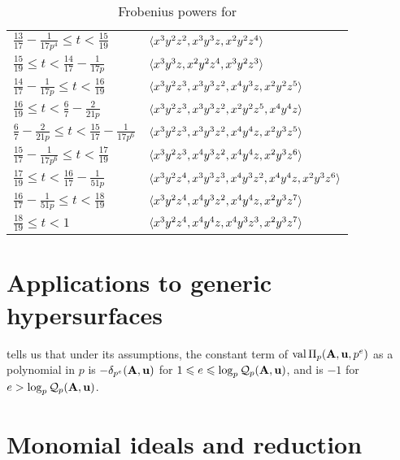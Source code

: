 \documentclass{amsart}
\begin{document}
\begin{example}
\begin{table}
\begin{center}
\begin{tabular}{ll}
        $\frac{13}{17} - \frac1{17 p^4} \le t < \frac{15}{19}$ & $\langle x^3y^2z^2, x^3y^3z, x^2y^2z^4 \rangle$ \\
        $\frac{15}{19} \le t < \frac{14}{17} - \frac1{17 p}$ & $\langle x^3y^3z, x^2y^2z^4, x^3y^2z^3 \rangle$ \\
        $\frac{14}{17} - \frac1{17 p} \le t < \frac{16}{19}$ & $\langle x^3y^2z^3, x^3y^3z^2, x^4y^3z, x^2y^2z^5 \rangle$ \\
        $\frac{16}{19} \le t < \frac67 - \frac2{21 p}$ & $\langle x^3y^2z^3, x^3y^3z^2, x^2y^2z^5, x^4y^4z \rangle$ \\
        $\frac67 - \frac2{21 p} \le t < \frac{15}{17} - \frac1{17 p^6}$ & $\langle x^3y^2z^3, x^3y^3z^2, x^4y^4z, x^2y^3z^5 \rangle$ \\
        $\frac{15}{17} - \frac1{17 p^6} \le t < \frac{17}{19}$ & $\langle x^3y^2z^3, x^4y^3z^2, x^4y^4z, x^2y^3z^6 \rangle$ \\
        $\frac{17}{19} \le t < \frac{16}{17} - \frac1{51 p}$ & $\langle x^3y^2z^4, x^3y^3z^3, x^4y^3z^2, x^4y^4z, x^2y^3z^6 \rangle$ \\
        $\frac{16}{17} - \frac1{51 p} \le t < \frac{18}{19}$ & $\langle x^3y^2z^4, x^4y^3z^2, x^4y^4z, x^2y^3z^7 \rangle$ \\
        $\frac{18}{19} \le t < 1$ & $\langle x^3y^2z^4, x^4y^4z, x^4y^3z^3, x^2y^3z^7 \rangle$ \\
        \bottomrule
      \end{tabular}
      \endgroup
   \end{center}
   \caption{Frobenius powers for }
   \label{table: main example}
\end{table}
\end{example}




\section{Applications to generic hypersurfaces}
\label{generic-hypersurfaces: S}

\begin{remark}
	 tells us that under its assumptions, the constant term of $\operatorname{val} \Pi_p(\mathbf{A},\mathbf{u},p^e)$ as a polynomial in $p$ is $- \delta_{p^e}(\mathbf{A},\mathbf{u})$ for
	$1 \leqslant e \leqslant \log_p \mathcal{Q}_p(\mathbf{A},\mathbf{u})$, and is $-1$ for $e > \log_p \mathcal{Q}_p(\mathbf{A},\mathbf{u})$.
\end{remark}


\newpage
\appendix

\section{Monomial ideals and reduction}
\label{monomial-reduction: A}
\end{document}
